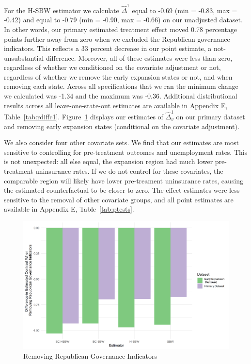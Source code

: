 For the H-SBW estimator we calculate $\hat{\Delta}^1$ equal to -0.69 (min = -0.83, max = -0.42) and equal to -0.79 (min = -0.90, max = -0.66) on our unadjusted dataset. In other words, our primary estimated treatment effect moved 0.78 percentage points further away from zero when we excluded the Republican governance indicators. This reflects a 33 percent decrease in our point estimate, a not-unsubstantial difference. Moreover, all of these estimates were less than zero, regardless of whether we conditioned on the covariate adjustment or not, regardless of whether we remove the early expansion states or not, and when removing each state. Across all specifications that we ran the minimum change we calculated was -1.34 and the maximum was -0.36. Additional distributional results across all leave-one-state-out estimates are available in Appendix E, Table~\ref{tab:rdiffc1}. Figure~\ref{fig:repub} displays our estimates of $\hat{\Delta}_v^1$ on our primary dataset and removing early expansion states (conditional on the covariate adjustment). 

We also consider four other covariate sets. We find that our estimates are most sensitive to controlling for pre-treatment outcomes and unemployment rates. This is not unexpected: all else equal, the expansion region had much lower pre-treatment uninsurance rates. If we do not control for these covariates, the comparable region will likely have lower pre-treament uninsurance rates, causing the estimated counterfactual to be closer to zero. The effect estimates were less sensitive to the removal of other covariate groups, and all point estimates are available in Appendix E, Table~\ref{tab:ptests}.

\begin{figure}[H]
\begin{center}
    \caption{Removing Republican Governance Indicators}
    \label{fig:repub}
    \includegraphics[scale=0.6]{01_Plots/repub-diff-all-estimators.png}
\end{center}
\end{figure}

